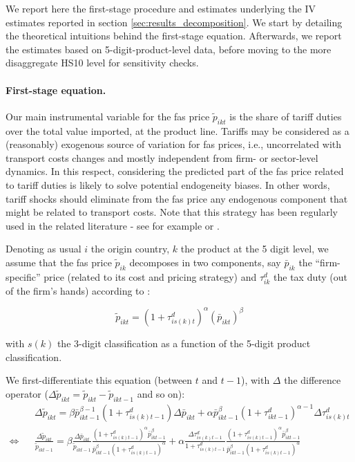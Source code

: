 \documentclass[a4paper,11pt]{article}
\begin{document}
We report here the first-stage procedure and estimates underlying the IV estimates reported in section \ref{sec:results_decomposition}. We start by detailing the theoretical intuitions behind the first-stage equation. Afterwards, we report the estimates based on 5-digit-product-level data, before moving to the more disaggregate HS10 level for sensitivity checks.

\paragraph{First-stage equation.}

Our main instrumental variable for the fas price $\widetilde{p}_{ikt}$ is the share of tariff duties over the total value imported, at the product line. Tariffs may be considered as a (reasonably) exogenous source of variation for fas prices, i.e., uncorrelated with transport costs changes and mostly independent from firm- or sector-level dynamics. In this respect, considering the predicted part of the fas price related to tariff duties is likely to solve potential endogeneity biases. In other words, tariff shocks should eliminate from the fas price any endogenous component that might be related to transport costs. Note that this strategy has been regularly used in the related literature - see for example \citet{Caliendo_Parro_2015} or \citet{Lashkaripour-2017}.

Denoting as usual $i$ the origin country, $k$ the product at the 5 digit level, we assume that the fas price $\widetilde{p}_{ik}$ decomposes in two components, say $\bar{p}_{ik}$ the ``firm-specific'' price (related to its cost and pricing strategy) and $\tau^d_{ik}$ the tax duty (out of the firm's hands) according to :

\begin{equation}
\widetilde{p}_{ikt} = (1+\tau^d_{is(k)t})^\alpha \left(\bar{p}_{ikt}\right)^\beta \label{eq:link_fas_duty}
\end{equation}

\noindent with $s(k)$ the 3-digit classification as a function of the 5-digit product classification.

We first-differentiate this equation (between $t$ and $t-1$), with $\Delta $ the difference operator ($\Delta\widetilde{p}_{ikt} = \widetilde{p}_{ikt} - \widetilde{p}_{ikt-1}$ and so on):
\begin{eqnarray*}
&&\Delta \widetilde{p}_{ikt} = \beta \bar{p}_{ikt-1}^{\beta-1}(1+\tau^d_{is(k)t-1})\Delta \bar{p}_{ikt} + \alpha \bar{p}^\beta_{ikt-1} (1+\tau^d_{ikt-1})^{\alpha-1}\Delta \tau^d_{is(k)t}  \\
\Leftrightarrow &&\frac{\Delta \widetilde{p}_{ikt}}{\widetilde{p}_{ikt-1}} = \beta \frac{\Delta \bar{p}_{ikt}}{\widetilde{p}_{ikt-1}} \frac{(1+\tau^d_{is(k)t-1})^\alpha \bar{p}_{ikt-1}^\beta}{\bar{p}^\beta_{ikt-1}(1+\tau^d_{is(k)t-1})^\alpha} +\alpha \frac{\Delta \tau^d_{is(k)t-1}}{1+\tau_{is(k)t-1}^d}\frac{(1+\tau^d_{is(k)t-1})^\alpha \bar{p}_{ikt-1}^\beta}{\bar{p}^\beta_{ikt-1}(1+\tau^d_{is(k)t-1})^\alpha} \end{eqnarray*}
\end{document}
